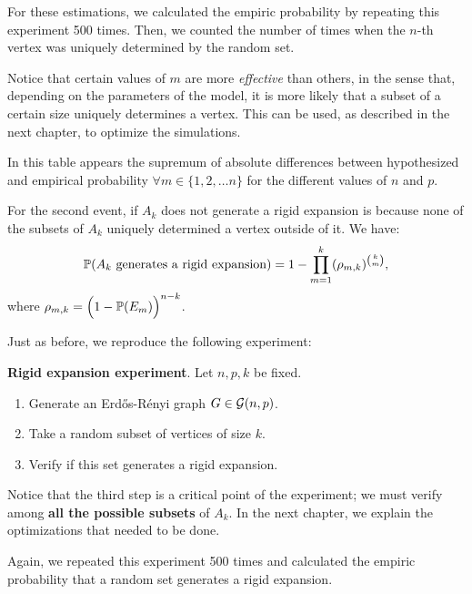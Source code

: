 For these estimations, we calculated the empiric probability by repeating this experiment 500 times. Then, we counted the number of times when the $n$-th vertex was uniquely determined by the random set.

Notice that certain values of $m$ are more \textit{effective} than others, in the sense that, depending on the parameters of the model, it is more likely that a subset of a certain size uniquely determines a vertex. This can be used, as described in the next chapter, to optimize the simulations.

In this table appears the supremum of absolute differences between hypothesized and empirical probability $\forall m \in \{1,2, \dots n\}$ for the different values of $n$ and $p$.

\vspace{0.3cm} 

\vspace{-0.3cm}

For the second event, if $A_k$ does not generate a rigid expansion is because none of the subsets of $A_{k}$ uniquely determined a vertex outside of it. We have:
$$\P(A_k \text{ generates a rigid expansion}) = 1 -  \prod_{m=1}^{k} (\rho_{m,k})^{\binom{k}{m}},$$
where $\rho_{m,k} = \Big(1 - \P(E_m)\Big)^{n-k}$.

Just as before, we reproduce the following experiment:
 
\begin{cajita}
\textbf{Rigid expansion experiment}. Let $n,p,k$ be fixed.
\begin{enumerate}
\item Generate an Erdős-Rényi graph $G\in \G(n,p)$.
\item Take a random subset of vertices of size $k$.
\item Verify if this set generates a rigid expansion.
\end{enumerate}
\end{cajita}

Notice that the third step is a critical point of the experiment; we must verify among \textbf{all the possible subsets} of $A_{k}$. In the next chapter, we explain the optimizations that needed to be done.

Again, we repeated this experiment 500 times and calculated the empiric probability that a random set generates a rigid expansion.

